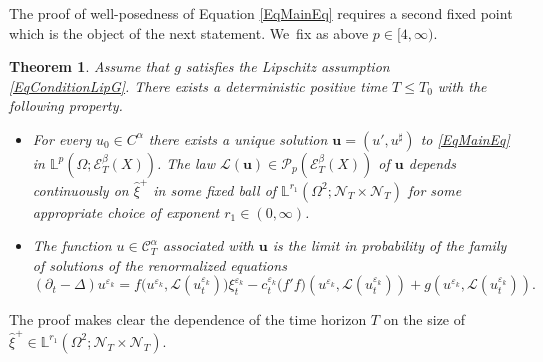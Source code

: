\documentclass[JEP,XML,SOM,Unicode,published]{cedram}
\newtheorem{thm}{Theorem}
\theoremstyle{definition}
\let\epsilon\varepsilon
\newcommand{\mcE}{\mathcal{E}}
\newcommand{\mcL}{\mathcal{L}}
\newcommand{\mcN}{\mathcal{N}}
\newcommand{\mcP}{\mathcal{P}}
\newcommand{\bbL}{\mathbb{L}}
\newcommand{\bsu}{\boldsymbol{u}}
\newcommand{\scrC}{\ensuremath{\mathscr{C}}}
\begin{document}
The proof of well-posedness of Equation \eqref{EqMainEq} requires a second fixed point which is the object of the next statement. We~fix as above $p\in[4,\infty)$.

\begin{thm} \label{SolMcKeanSingular}
Assume that $g$ satisfies the Lipschitz assumption \eqref{EqConditionLipG}. There exists a deterministic positive time $T\leq T_0$ with the following property.
\begin{itemize}
\item
For every $u_0\in C^\alpha$ there exists a unique solution $\bsu=(u',u^\sharp)$ to \eqref{EqMainEq} in $\bbL^p(\Omega; \mcE^\beta_T (X))$. The law $\mcL(\bsu) \in \mcP_p(\mcE^\beta_T (X))$ of $\bsu$ depends continuously on $\widehat\xi^+$ in some fixed ball of $\bbL^{r_1}(\Omega^2; {{\boldsymbol{\mcN}}_T}\times{{\boldsymbol{\mcN}}_T})$ for some appropriate choice of exponent $r_1\in(0,\infty)$. 

\item
The function $u\in\scrC^\alpha_T$ associated with $\bsu$ is the limit in probability of the family of solutions of the renormalized equations
\[
(\partial_t - \Delta)u^{\epsilon_k} = f\bigl(u^{\epsilon_k}, \mcL(u^{\epsilon_k}_t)\bigr) \xi^{\epsilon_k}_t - c^{\epsilon_k}_t \bigl(f'f\bigr)(u^{\epsilon_k}, \mcL(u^{\epsilon_k}_t)) + g(u^{\epsilon_k},\mcL(u^{\epsilon_k}_t)).
\]
\end{itemize}
\end{thm}

The proof makes clear the dependence of the time horizon $T$ on the size of $\widehat\xi^+\in\bbL^{r_1}(\Omega^2; {{\boldsymbol{\mcN}}_T}\times{{\boldsymbol{\mcN}}_T})$.
\end{document}

